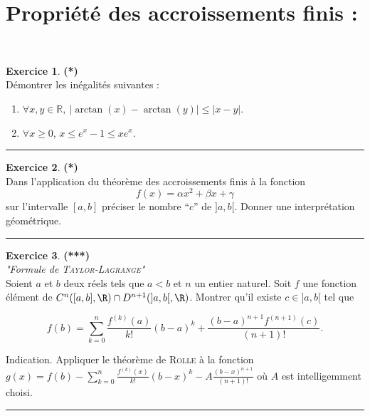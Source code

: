 \documentclass[a4paper,11pt]{article}
\theoremstyle{definition}
\newtheorem{exo}{Exercice} %
\begin{document}
\section*{Propriété des accroissements finis :}\hfill\\%
\begin{minipage}{1\linewidth}
	\begin{minipage}[t]{0.48\linewidth}
		\raggedright
		
		\begin{exo}\textbf{(*)}\quad\\[0.2cm]
		Démontrer les inégalités suivantes : 
		\begin{enumerate}
			\item $\forall x,y\in\mathbb R,\ |\arctan(x)-\arctan(y)|\leq |x-y|$.
			\item $\forall x\geq 0$, $x\leq e^x-1\leq xe^x$.
		\end{enumerate}
	
		\centering
	\rule{1\linewidth}{0.6pt}
\end{exo}
		
		
		\begin{exo}\textbf{(*)}\quad\\[0.2cm]
	Dans l'application du th\'eor\`eme des accroissements finis
	\`a la fonction
	$$ f(x) =\alpha x^2+\beta x+\gamma$$
	sur l'intervalle $[a,b]$
	pr\'eciser le nombre ``$c$'' de $]a,b[$.
	Donner une interpr\'etation g\'eom\'etrique.
	
	\centering
	\rule{1\linewidth}{0.6pt}
\end{exo}
		
		
	\end{minipage}	
	\hfill\vrule\hfill
	\begin{minipage}[t]{0.48\linewidth}
		\raggedright
		
		\begin{exo}\textbf{(***)} \quad\\[0.2cm]
			\textit{"Formule de \textsc{Taylor-Lagrange}"}\\[0.4cm] 
			
			Soient $a$ et $b$ deux réels tels que $a<b$ et $n$ un entier naturel. Soit $f$ une fonction élément de $C^n([a,b],\R)\cap D^{n+1}(]a,b[,\R)$. Montrer qu'il existe $c\in]a,b[$ tel que 
			
			$$f(b)=\sum_{k=0}^{n}\frac{f^{(k)}(a)}{k!}(b-a)^k+\frac{(b-a)^{n+1}f^{(n+1)}(c)}{(n+1)!}.$$
			
			Indication. Appliquer le théorème de \textsc{Rolle} à la fonction $g(x)=f(b)-\sum_{k=0}^{n}\frac{f^{(k)}(x)}{k!}(b-x)^k-A\frac{(b-x)^{n+1}}{(n+1)!}$ où $A$ est intelligemment choisi.
			
			\centering
			\rule{1\linewidth}{0.6pt}
		\end{exo}

		
		
	\end{minipage}
\end{minipage}
\newpage
\end{document}
